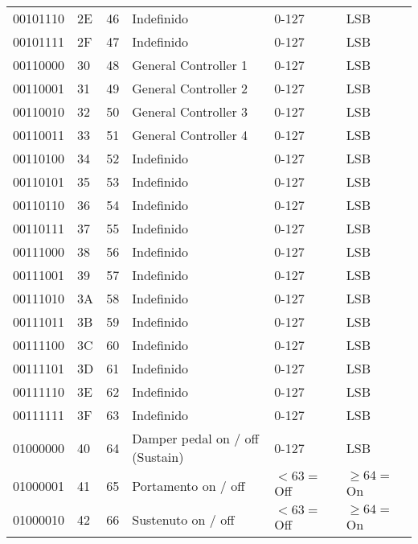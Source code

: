 \begin{center}
\begin{supertabular}{| C{2cm} | C{1.5cm} | C{1.5cm} | C{5.3cm} | C{1.5cm} | C{1.5cm} |}
             00101110 & 2E & 46  & Indefinido & 0-127 & LSB \\
                00101111 & 2F & 47  & Indefinido & 0-127 & LSB \\
             00110000 & 30 & 48  & General Controller 1 & 0-127 & LSB \\
                00110001 & 31 & 49  & General Controller 2 & 0-127 & LSB \\
             00110010 & 32 & 50  & General Controller 3 & 0-127 & LSB \\
                00110011 & 33 & 51  & General Controller 4 & 0-127 & LSB \\
             00110100 & 34 & 52  & Indefinido & 0-127 & LSB \\
                00110101 & 35 & 53  & Indefinido & 0-127 & LSB \\
             00110110 & 36 & 54  & Indefinido & 0-127 & LSB \\
                00110111 & 37 & 55  & Indefinido & 0-127 & LSB \\
             00111000 & 38 & 56  & Indefinido & 0-127 & LSB \\
                00111001 & 39 & 57  & Indefinido & 0-127 & LSB \\
             00111010 & 3A & 58  & Indefinido & 0-127 & LSB \\
                00111011 & 3B & 59  & Indefinido & 0-127 & LSB \\
             00111100 & 3C & 60  & Indefinido & 0-127 & LSB \\
                00111101 & 3D & 61  & Indefinido & 0-127 & LSB \\
             00111110 & 3E & 62  & Indefinido & 0-127 & LSB \\
                00111111 & 3F & 63  & Indefinido & 0-127 & LSB \\
             01000000 & 40 & 64  & Damper pedal on / off (Sustain) & 0-127 & LSB \\
                01000001 & 41 & 65  & Portamento on / off & $< 63 =$  Off &  $\geq 64 =$ On \\
             01000010 & 42 & 66  & Sustenuto on / off & $< 63 =$  Off &  $\geq 64 =$ On \\

\end{supertabular}
\end{center}
